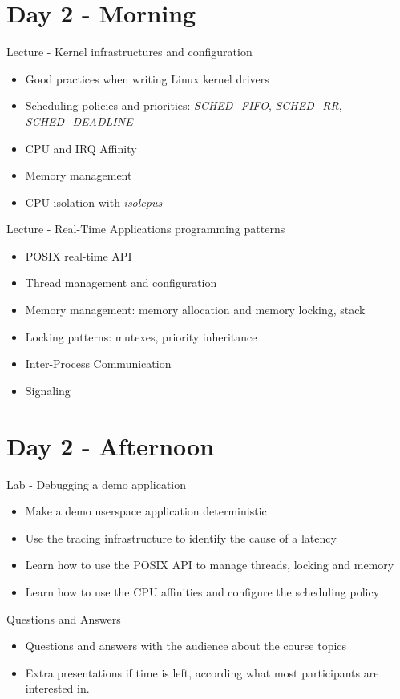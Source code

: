 \documentclass[a4paper,12pt,obeyspaces,spaces,hyphens]{article}
\begin{document}
\section{Day 2 - Morning}

\feagendaonecolumn
{Lecture - Kernel infrastructures and configuration}
{
  \begin{itemize}
  \item Good practices when writing Linux kernel drivers
  \item Scheduling policies and priorities: {\em SCHED\_FIFO}, {\em
      SCHED\_RR}, {\em SCHED\_DEADLINE}
  \item CPU and IRQ Affinity
  \item Memory management
  \item CPU isolation with {\em isolcpus}
  \end{itemize}
}

\feagendaonecolumn
{Lecture - Real-Time Applications programming patterns}
{
  \begin{itemize}
  \item POSIX real-time API
  \item Thread management and configuration
  \item Memory management: memory allocation and memory locking, stack
  \item Locking patterns: mutexes, priority inheritance
  \item Inter-Process Communication
  \item Signaling
  \end{itemize}
}

\section{Day 2 - Afternoon}

\feagendaonecolumn
{Lab - Debugging a demo application}
{
  \begin{itemize}
  \item Make a demo userspace application deterministic
  \item Use the tracing infrastructure to identify the cause of a latency
  \item Learn how to use the POSIX API to manage threads, locking and memory
  \item Learn how to use the CPU affinities and configure the scheduling policy
  \end{itemize}
}

\feagendaonecolumn
{Questions and Answers}
{
  \begin{itemize}
  \item Questions and answers with the audience about the course topics
  \item Extra presentations if time is left, according what most
        participants are interested in.
  \end{itemize}
}
\end{document}
